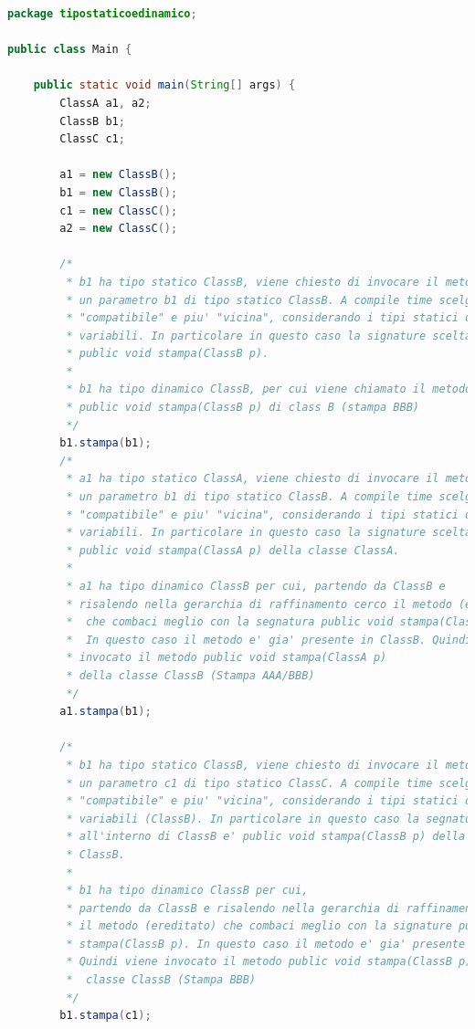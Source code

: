 \documentclass{article}
\begin{document}
\begin{lstlisting}[language=Java,escapechar=|]
package tipostaticoedinamico;

public class Main {

	public static void main(String[] args) {
		ClassA a1, a2;
		ClassB b1;
		ClassC c1;

		a1 = new ClassB();
		b1 = new ClassB();
		c1 = new ClassC();
		a2 = new ClassC();

		/*
		 * b1 ha tipo statico ClassB, viene chiesto di invocare il metodo stampa su
		 * un parametro b1 di tipo statico ClassB. A compile time scelgo la segnatura
		 * "compatibile" e piu' "vicina", considerando i tipi statici delle
		 * variabili. In particolare in questo caso la signature scelta e'
		 * public void stampa(ClassB p).
		 * 
		 * b1 ha tipo dinamico ClassB, per cui viene chiamato il metodo
		 * public void stampa(ClassB p) di class B (stampa BBB)
		 */
		b1.stampa(b1);
		/*
		 * a1 ha tipo statico ClassA, viene chiesto di invocare il metodo stampa su
		 * un parametro b1 di tipo statico ClassB. A compile time scelgo la segnatura
		 * "compatibile" e piu' "vicina", considerando i tipi statici delle
		 * variabili. In particolare in questo caso la signature scelta e'
		 * public void stampa(ClassA p) della classe ClassA.
		 * 
		 * a1 ha tipo dinamico ClassB per cui, partendo da ClassB e
		 * risalendo nella gerarchia di raffinamento cerco il metodo (ereditato)
		 *  che combaci meglio con la segnatura public void stampa(ClassA p).
		 *  In questo caso il metodo e' gia' presente in ClassB. Quindi viene 
		 * invocato il metodo public void stampa(ClassA p) 
		 * della classe ClassB (Stampa AAA/BBB)
		 */
		a1.stampa(b1);

		/*
		 * b1 ha tipo statico ClassB, viene chiesto di invocare il metodo stampa su
		 * un parametro c1 di tipo statico ClassC. A compile time scelgo la segnatura
		 * "compatibile" e piu' "vicina", considerando i tipi statici delle
		 * variabili (ClassB). In particolare in questo caso la segnatura scelta
		 * all'interno di ClassB e' public void stampa(ClassB p) della classe
		 * ClassB.
		 * 
		 * b1 ha tipo dinamico ClassB per cui,
		 * partendo da ClassB e risalendo nella gerarchia di raffinamento, cerco
		 * il metodo (ereditato) che combaci meglio con la signature public void 
		 * stampa(ClassB p). In questo caso il metodo e' gia' presente in ClassB.
		 * Quindi viene invocato il metodo public void stampa(ClassB p) della
		 *  classe ClassB (Stampa BBB)
		 */
		b1.stampa(c1);


\end{lstlisting}
\end{document}

